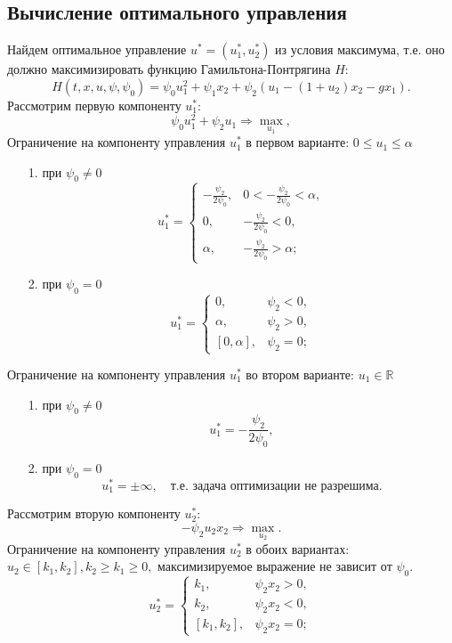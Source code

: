 \documentclass[11pt]{article}
\begin{document}
	
	{\subsection{Вычисление оптимального управления}}
	{Найдем оптимальное управление $u^* = (u_1^*, u_2^*)$ из условия максимума, т.е. оно должно максимизировать функцию Гамильтона-Понтрягина $H$:}
	\[ H(t,x,u,\psi,\psi_0) = \psi_0 u_1^2 + \psi_1x_2 + \psi_2(u_1 - (1 + u_2)x_2 - gx_1). \]
	{Рассмотрим первую компоненту $u_1^*$:}
	\[ \psi_0u_1^2 + \psi_2 u_1 \Rightarrow \underset{u_1}{\max}, \]
	{Ограничение на компоненту управления $u_1^*$ в первом варианте: $0 \leq u_1 \leq \alpha$}
	\begin{itemize}
		\item [1.]{при $\psi_0 \neq 0 $ 
		\[ u_1^* = \begin{cases}
		-\frac{\psi_2}{2\psi_0}, & 0 < -\frac{\psi_2}{2\psi_0} < \alpha, \\
		0,& -\frac{\psi_2}{2\psi_0} < 0,\\
		\alpha,& -\frac{\psi_2}{2\psi_0} > \alpha;
		\end{cases} \]	
	}
		\item [2.]{при $\psi_0 = 0 $
	\[ u_1^* = \begin{cases}
	0,& \psi_2 < 0,\\
	\alpha,& \psi_2 > 0,\\
	[0, \alpha],& \psi_2 = 0;
	\end{cases} \]		}
	\end{itemize}
	{Ограничение на компоненту управления $u_1^*$ во втором варианте: $u_1 \in \mathbb{R}$}
	\begin{itemize}
		\item [1.]{при $\psi_0 \neq 0 $ 
			\[ u_1^* = -\frac{\psi_2}{2\psi_0} ,\]
		}
		\item [2.]{при $\psi_0 = 0 $
			\[ u_1^* = \pm \infty, \quad \text{т.е. задача оптимизации не разрешима.} \]	}
	\end{itemize}
	{Рассмотрим вторую компоненту $u_2^*:$}
	\[-\psi_2u_2x_2 \Rightarrow \underset{u_2}{\max}. \]
	{Ограничение на компоненту управления $u_2^*$ в обоих вариантах: $u_2 \in [k_1,k_2], k_2 \geq k_1 \geq 0,$ максимизируемое выражение не зависит от $\psi_0.$}
	\[ u_2^* = \begin{cases}
	k_1,&  \psi_2x_2 > 0,\\
	k_2,& \psi_2x_2 < 0,\\
	[k_1,k_2],&  \psi_2x_2 = 0;
	\end{cases} \]
	
\end{document}
